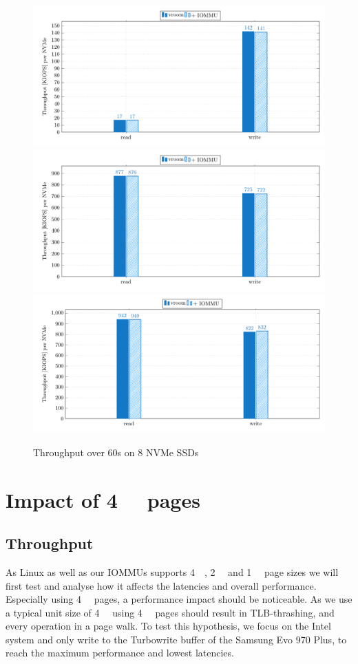 \begin{figure}[H]
  \centering
   {\includegraphics[width=.7\textwidth]{figures/throughput_bar_qd1t1_8nvmes} }
   {\includegraphics[width=.7\textwidth]{figures/throughput_bar_qd32t4_8nvmes} }
   {\includegraphics[width=.7\textwidth]{figures/throughput_bar_qd128t16_8nvmes} }
  \caption{Throughput over 60s on 8 NVMe SSDs}
  \label{fig:throughput-bar-8n}
\end{figure}

\section{Impact of \qty{4}{\kibi\byte} pages}
\subsection{Throughput}
As Linux as well as our IOMMUs supports \qty{4}{\kibi\byte}, \qty{2}{\mebi\byte} and \qty{1}{\gibi\byte} page sizes we will first test and analyse how it affects the latencies and overall performance. Especially using \qty{4}{\kibi\byte} pages, a performance impact should be noticeable. As we use a typical unit size of \qty{4}{\kibi\byte} using \qty{4}{\kibi\byte} pages should result in TLB-thrashing, and every operation in a page walk. To test this hypothesis, we focus on the Intel system and only write to the Turbowrite buffer of the Samsung Evo 970 Plus, to reach the maximum performance and lowest latencies.

